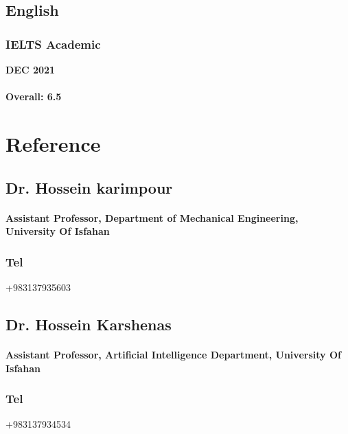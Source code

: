 \documentclass[a4paper]{article}
\begin{document}
    \subsection{English}
        \subsubsection{IELTS Academic}
        \hfill
        {\bfseries DEC 2021}
        \paragraph{Overall: 6.5}

    \section{Reference}

        \subsection{Dr. Hossein karimpour}
        \paragraph{\bfseries Assistant Professor, Department of Mechanical Engineering, University Of Isfahan}

        \subsubsection{\large Tel} {\large +983137935603}
        
        \Large\href{mailto:h.karimpour@eng.ui.ac.ir}{}
        \Large\href{http://eng.ui.ac.ir/~h.karimpour}{}
        \Large\href{https://www.linkedin.com/in/hossein-karimpour-38373811a}{}

        \subsection{Dr. Hossein Karshenas}

        \paragraph{\bfseries Assistant Professor, Artificial Intelligence Department, University Of Isfahan}
        \subsubsection{\large Tel} {\large +983137934534}
        
\end{document}
